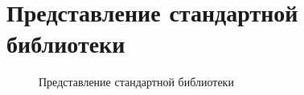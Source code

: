 \chapter{Представление стандартной библиотеки}
\label{cha:appendix_builtin}


\begin{figure}[h]
    \centering

    

    \caption{Представление стандартной библиотеки}
    \label{fig:valgrind-massif}
\end{figure}

